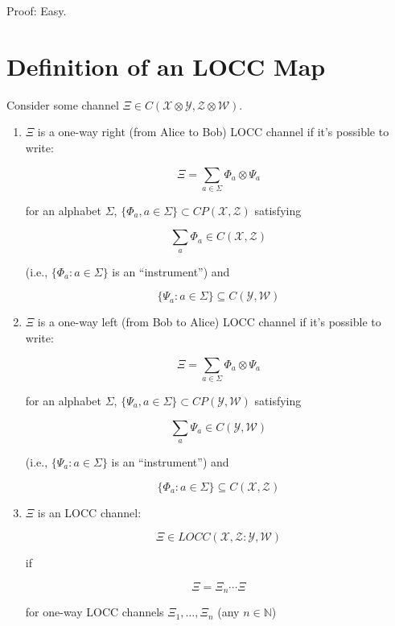 \documentclass{article}
\begin{document}
Proof: Easy.

\section*{Definition of an LOCC Map}

Consider some channel $\Xi \in C(\mathcal{X} \otimes \mathcal{Y} , \mathcal{Z}
\otimes \mathcal{W})$.

\begin{enumerate}
    \item $\Xi$ is a one-way right (from Alice to Bob) LOCC channel if it's
        possible to write:

        \[ 
                \Xi = \sum_{a \in \Sigma} \Phi_a \otimes \Psi_a 
        \]
        
        for an alphabet $\Sigma$, $\{\Phi_a, a \in \Sigma\} \subset
        CP(\mathcal{X},\mathcal{Z})$ satisfying

        \[ 
                \sum_a \Phi_a \in C(\mathcal{X},\mathcal{Z}) 
        \]
        
        (i.e., $\{ \Phi_a : a \in \Sigma \}$ is an ``instrument'') and 

        \[ 
                \{ \Psi_a : a \in \Sigma \} \subseteq
                C(\mathcal{Y},\mathcal{W}) 
        \]
        
    \item $\Xi$ is a one-way left (from Bob to Alice) LOCC channel if it's
        possible to write:

        \[ 
                \Xi = \sum_{a \in \Sigma} \Phi_a \otimes \Psi_a 
        \]
        
        for an alphabet $\Sigma$, $\{\Psi_a, a \in \Sigma\} \subset
        CP(\mathcal{Y},\mathcal{W})$ satisfying

        \[ 
                \sum_a \Psi_a \in C(\mathcal{Y},\mathcal{W}) 
        \]
        
        (i.e., $\{ \Psi_a : a \in \Sigma \}$ is an ``instrument'') and 

        \[ 
                \{ \Phi_a : a \in \Sigma \} \subseteq
                C(\mathcal{X},\mathcal{Z}) 
        \]

    \item $\Xi$ is an LOCC channel:

        \[ 
                \Xi \in LOCC(\mathcal{X},\mathcal{Z}:\mathcal{Y},\mathcal{W}) 
        \]
        
        if 
        
        \[ 
            \Xi = \Xi_n \cdots \Xi 
        \]
        
        for one-way LOCC channels $\Xi_1, \ldots, \Xi_n$ (any $n \in
        \mathds{N}$)

\end{enumerate}
\end{document}
